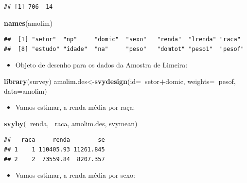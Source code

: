 \documentclass[]{book}
\newenvironment{Shaded}{\begin{snugshade}}{\end{snugshade}}
\newcommand{\KeywordTok}[1]{\textcolor[rgb]{0.13,0.29,0.53}{\textbf{#1}}}
\newcommand{\DataTypeTok}[1]{\textcolor[rgb]{0.13,0.29,0.53}{#1}}
\newcommand{\OperatorTok}[1]{\textcolor[rgb]{0.81,0.36,0.00}{\textbf{#1}}}
\newcommand{\NormalTok}[1]{#1}
\providecommand{\tightlist}{%
  \setlength{\itemsep}{0pt}\setlength{\parskip}{0pt}}
\theoremstyle{definition}
\theoremstyle{definition}
\theoremstyle{definition}
\theoremstyle{remark}
\begin{document}
\begin{verbatim}
## [1] 706  14
\end{verbatim}

\begin{Shaded}
\begin{Highlighting}[]
\KeywordTok{names}\NormalTok{(amolim)}
\end{Highlighting}
\end{Shaded}

\begin{verbatim}
##  [1] "setor"  "np"     "domic"  "sexo"   "renda"  "lrenda" "raca"  
##  [8] "estudo" "idade"  "na"     "peso"   "domtot" "peso1"  "pesof"
\end{verbatim}

\begin{itemize}
\tightlist
\item
  Objeto de desenho para os dados da Amostra de Limeira:
\end{itemize}

\begin{Shaded}
\begin{Highlighting}[]
\KeywordTok{library}\NormalTok{(survey)}
\NormalTok{amolim.des<-}\KeywordTok{svydesign}\NormalTok{(}\DataTypeTok{id=}\OperatorTok{~}\NormalTok{setor}\OperatorTok{+}\NormalTok{domic, }\DataTypeTok{weights=}\OperatorTok{~}\NormalTok{pesof,}
  \DataTypeTok{data=}\NormalTok{amolim)}
\end{Highlighting}
\end{Shaded}

\begin{itemize}
\tightlist
\item
  Vamos estimar, a renda média por raça:
\end{itemize}

\begin{Shaded}
\begin{Highlighting}[]
\KeywordTok{svyby}\NormalTok{(}\OperatorTok{~}\NormalTok{renda, }\OperatorTok{~}\NormalTok{raca, amolim.des, svymean)}
\end{Highlighting}
\end{Shaded}

\begin{verbatim}
##   raca     renda        se
## 1    1 110405.93 11261.845
## 2    2  73559.84  8207.357
\end{verbatim}

\begin{itemize}
\tightlist
\item
  Vamos estimar, a renda média por sexo:
\end{itemize}
\end{document}
